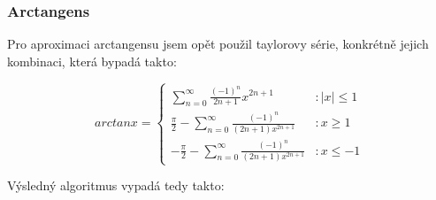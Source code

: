 \documentclass{article}
\begin{document}
    \subsubsection{Arctangens}
    Pro aproximaci arctangensu jsem opět použil taylorovy série, konkrétně jejich kombinaci, která bypadá takto:
    \begin{center}
        \begin{equation*}            
            arctan x = \begin{cases}
                \displaystyle\sum_{n=0}^{\infty}\frac{(-1)^n}{2n+1}x^{2n+1} & \text{$: |x|\leq 1$}\\
                \frac{\pi}{2}-\displaystyle\sum_{n=0}^{\infty}\frac{(-1)^n}{(2n+1)x^{2n+1}} & \text{$: x \geq 1$}\\
                -\frac{\pi}{2}-\displaystyle\sum_{n=0}^{\infty}\frac{(-1)^n}{(2n+1)x^{2n+1}} & \text{$: x \leq -1$}
            \end{cases}
        \end{equation*}
    \end{center}
    Výsledný algoritmus vypadá tedy takto:
    \sloppy
\end{document}
